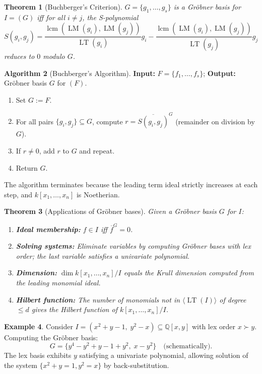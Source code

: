 \documentclass[12pt,a4paper]{amsart}
\newtheorem{theorem}{Theorem}[section]
\theoremstyle{definition}
\newtheorem{example}[theorem]{Example}
\theoremstyle{definition}
\newtheorem{algorithm}[theorem]{Algorithm}
\begin{document}
\begin{theorem}[Buchberger's Criterion]
$G = \{g_1,\ldots,g_s\}$ is a Gröbner basis for $I = (G)$ iff for all $i \neq j$,
the \emph{S-polynomial}
\[
  S(g_i, g_j) = \frac{\operatorname{lcm}(\operatorname{LM}(g_i), \operatorname{LM}(g_j))}{\operatorname{LT}(g_i)} g_i
  - \frac{\operatorname{lcm}(\operatorname{LM}(g_i), \operatorname{LM}(g_j))}{\operatorname{LT}(g_j)} g_j
\]
reduces to $0$ modulo $G$.
\end{theorem}

\begin{algorithm}[Buchberger's Algorithm]
\textbf{Input:} $F = \{f_1,\ldots,f_s\}$; \textbf{Output:} Gröbner basis $G$ for $(F)$.
\begin{enumerate}
  \item Set $G := F$.
  \item For all pairs $\{g_i, g_j\} \subseteq G$, compute $r = \overline{S(g_i,g_j)}^G$
        (remainder on division by $G$).
  \item If $r \neq 0$, add $r$ to $G$ and repeat.
  \item Return $G$.
\end{enumerate}
The algorithm terminates because the leading term ideal strictly increases at each step,
and $k[x_1,\ldots,x_n]$ is Noetherian.
\end{algorithm}

\begin{theorem}[Applications of Gröbner bases]
Given a Gröbner basis $G$ for $I$:
\begin{enumerate}[label=(\roman*)]
  \item \textbf{Ideal membership:} $f \in I$ iff $\overline{f}^G = 0$.
  \item \textbf{Solving systems:} Eliminate variables by computing Gröbner bases
        with lex order; the last variable satisfies a univariate polynomial.
  \item \textbf{Dimension:} $\dim k[x_1,\ldots,x_n]/I$ equals the Krull dimension
        computed from the leading monomial ideal.
  \item \textbf{Hilbert function:} The number of monomials \emph{not} in
        $\langle \operatorname{LT}(I) \rangle$ of degree $\leq d$ gives the
        Hilbert function of $k[x_1,\ldots,x_n]/I$.
\end{enumerate}
\end{theorem}

\begin{example}
Consider $I = (x^2 + y - 1,\; y^2 - x) \subseteq \mathbb{Q}[x,y]$ with lex order $x \succ y$.
Computing the Gröbner basis:
\[
  G = \{y^4 - y^2 + y - 1 + y^2,\; x - y^2\} \quad\text{(schematically)}.
\]
The lex basis exhibits $y$ satisfying a univariate polynomial, allowing solution
of the system $\{x^2 + y = 1, y^2 = x\}$ by back-substitution.
\end{example}
\end{document}
